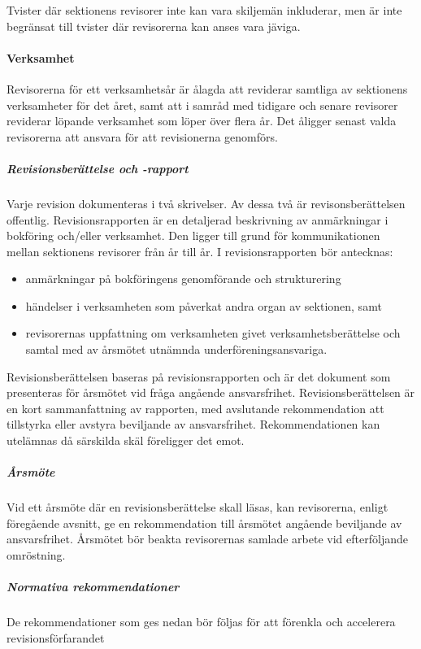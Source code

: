 \documentclass{../resources/dgovdoc}
\begin{document}
Tvister där sektionens revisorer inte kan vara skiljemän inkluderar,
men är inte begränsat till tvister där revisorerna kan anses vara jäviga. 

\paragraph{Verksamhet}

Revisorerna för ett verksamhetsår är ålagda att reviderar samtliga av sektionens verksamheter
för det året, samt att i samråd med tidigare och senare revisorer reviderar löpande verksamhet som löper över flera år.
Det åligger senast valda revisorerna att ansvara för att revisionerna genomförs.

\subparagraph{Revisionsberättelse och -rapport} 

Varje revision dokumenteras i två skrivelser. Av dessa två är revisonsberättelsen offentlig. 
Revisionsrapporten är en detaljerad beskrivning av anmärkningar i bokföring och/eller verksamhet.
Den ligger till grund för kommunikationen mellan sektionens revisorer från år till år. I revisionsrapporten bör antecknas:

\begin{itemize}
\item anmärkningar på bokföringens genomförande och strukturering
\item händelser i verksamheten som påverkat andra organ av sektionen, samt
\item revisorernas uppfattning om verksamheten givet verksamhetsberättelse och samtal med av årsmötet utnämnda underföreningsansvariga.
\end{itemize}

Revisionsberättelsen baseras på revisionsrapporten och är det dokument som presenteras för årsmötet vid fråga angående ansvarsfrihet. Revisionsberättelsen är en kort sammanfattning av rapporten, med avslutande rekommendation att tillstyrka eller avstyra beviljande av ansvarsfrihet. Rekommendationen kan utelämnas då särskilda skäl föreligger det emot.

\subparagraph{Årsmöte}

Vid ett årsmöte där en revisionsberättelse skall läsas, kan revisorerna, enligt föregående avsnitt, ge en rekommendation till årsmötet angående beviljande av ansvarsfrihet. Årsmötet bör beakta revisorernas samlade arbete vid efterföljande omröstning.

\subparagraph{Normativa rekommendationer}

De rekommendationer som ges nedan bör följas för att förenkla och accelerera revisionsförfarandet
\end{document}

